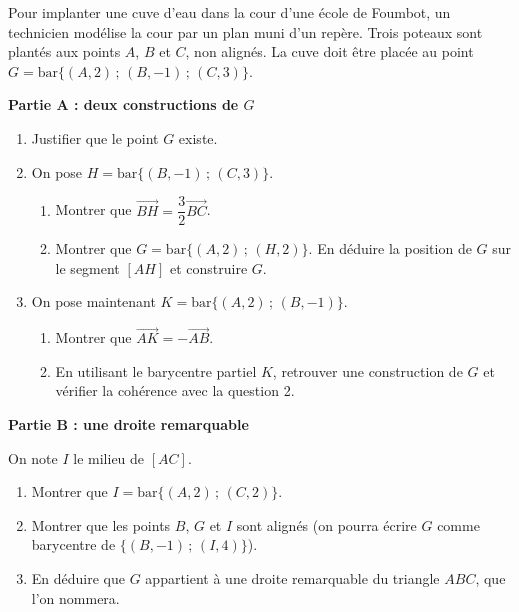 \documentclass[11pt]{article}
\begin{document}
\begin{exercice}
Pour implanter une cuve d'eau dans la cour d'une école de Foumbot, un technicien modélise la cour par un plan muni d'un repère. Trois poteaux sont plantés aux points $A$, $B$ et $C$, non alignés. La cuve doit être placée au point $G = \mathrm{bar}\{(A,2)\,;\,(B,-1)\,;\,(C,3)\}$.

\textbf{Partie A : deux constructions de $G$}
\begin{enumerate}
\item Justifier que le point $G$ existe.
\item On pose $H = \mathrm{bar}\{(B,-1)\,;\,(C,3)\}$.
\begin{enumerate}
\item Montrer que $\overrightarrow{BH} = \dfrac{3}{2}\overrightarrow{BC}$.
\item Montrer que $G = \mathrm{bar}\{(A,2)\,;\,(H,2)\}$. En déduire la position de $G$ sur le segment $[AH]$ et construire $G$.
\end{enumerate}
\item On pose maintenant $K = \mathrm{bar}\{(A,2)\,;\,(B,-1)\}$.
\begin{enumerate}
\item Montrer que $\overrightarrow{AK} = -\overrightarrow{AB}$.
\item En utilisant le barycentre partiel $K$, retrouver une construction de $G$ et vérifier la cohérence avec la question 2.
\end{enumerate}
\end{enumerate}

\textbf{Partie B : une droite remarquable}

On note $I$ le milieu de $[AC]$.
\begin{enumerate}
\item Montrer que $I = \mathrm{bar}\{(A,2)\,;\,(C,2)\}$.
\item Montrer que les points $B$, $G$ et $I$ sont alignés (on pourra écrire $G$ comme barycentre de $\{(B,-1)\,;\,(I,4)\}$).
\item En déduire que $G$ appartient à une droite remarquable du triangle $ABC$, que l'on nommera.
\end{enumerate}
\end{exercice}
\end{document}
